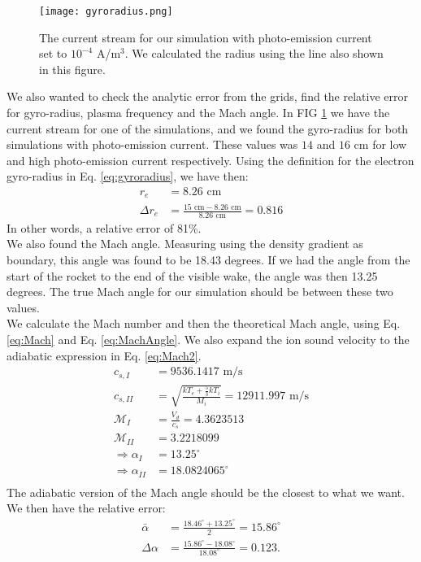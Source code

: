\documentclass[aip, 
rsi, 
amsmath,
amssymb,
longbibliography,
preprint]{revtex4-1}
\begin{document}
\begin{figure}
\texttt{[image: gyroradius.png]}
\caption{The current stream for our simulation with photo-emission current set to $10^{-4}$ A/m$^3$. We calculated the radius using the line also shown in this figure.\label{fig:gyroradius}}
\end{figure}

We also wanted to check the analytic error from the grids, find the relative error for gyro-radius, plasma frequency and the Mach angle. In FIG \ref{fig:gyroradius} we have the current stream for one of the simulations, and we found the gyro-radius for both simulations with photo-emission current. These values was $14$ and $16$ cm for low and high photo-emission current respectively. Using the definition for the electron gyro-radius in Eq. \ref{eq:gyroradius}, we have then:
\begin{align*}
r_e &= 8.26 \, \, \text{cm}\\
\Delta r_e &= \frac{15 \, \, \text{cm}- 8.26 \, \, \text{cm}}{8.26 \, \, \text{cm}} = 0.816
\end{align*}
In other words, a relative error of 81\%.\\

We also found the Mach angle. Measuring using the density gradient as boundary, this angle was found to be 18.43 degrees. If we had the angle from the start of the rocket to the end of the visible wake, the angle was then 13.25 degrees. The true Mach angle for our simulation should be between these two values.\\

We calculate the Mach number and then the theoretical Mach angle, using Eq. \ref{eq:Mach} and Eq. \ref{eq:MachAngle}. We also expand the ion sound velocity to the adiabatic expression in Eq. \ref{eq:Mach2}.
\begin{align*}
c_{s,I} &= 9536.1417 \, \, \text{m/s}\\
c_{s,II} &= \sqrt{\frac{kT_e + \frac{5}{3} k T_i}{ M_i}} = 12911.997 \, \, \text{m/s}\\
\mathcal{M}_{I} &= \frac{V_d}{c_s} = 4.3623513\\
\mathcal{M}_{II} &= 3.2218099\\
\Rightarrow \alpha_{I} &= 13.25 ^{\circ}\\
\Rightarrow \alpha_{II} &= 18.0824065 ^{\circ}\\
\end{align*}
The adiabatic version of the Mach angle should be the closest to what we want. We then have the relative error:
\begin{align*}
\bar{\alpha} &= \frac{18.46^{\circ} + 13.25^{\circ}}{2} = 15.86^{\circ}\\
\Delta \alpha &= \frac{15.86 ^{\circ}- 18.08^{\circ}}{18.08^{\circ}} = 0.123.
\end{align*}
\end{document}
